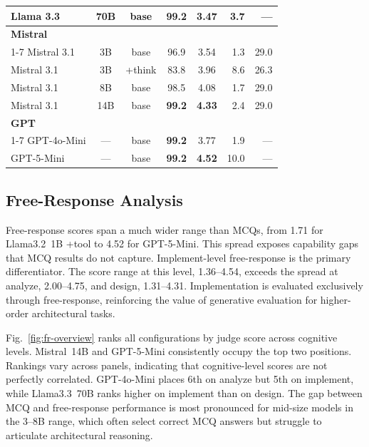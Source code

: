 \documentclass[conference]{IEEEtran}
\begin{document}
\begin{table}[t]
{\begin{tabular}{@{}lccccrr@{}}
    Llama 3.3     & 70B & base    & \textbf{99.2} & 3.47 & 3.7  & --- \\
    \midrule
    \multicolumn{7}{l}{\textbf{Mistral}} \\
    \cmidrule(lr){1-7}
    Mistral 3.1   & 3B  & base    & 96.9          & 3.54 & 1.3  & 29.0 \\
    Mistral 3.1   & 3B  & +think  & 83.8          & 3.96 & 8.6  & 26.3 \\
    Mistral 3.1   & 8B  & base    & 98.5          & 4.08 & 1.7  & 29.0 \\
    Mistral 3.1   & 14B & base    & \textbf{99.2} & \textbf{4.33} & 2.4 & 29.0 \\
    \midrule
    \multicolumn{7}{l}{\textbf{GPT}} \\
    \cmidrule(lr){1-7}
    GPT-4o-Mini   & --- & base    & \textbf{99.2} & 3.77 & 1.9  & --- \\
    GPT-5-Mini    & --- & base    & \textbf{99.2} & \textbf{4.52} & 10.0 & --- \\
    \bottomrule
  \end{tabular}}
\end{table}

\subsection{Free-Response Analysis}

Free-response scores span a much wider range than MCQs, from 1.71 for Llama3.2~1B +tool to 4.52 for GPT-5-Mini. This spread exposes capability gaps that MCQ results do not capture. Implement-level free-response is the primary differentiator. The score range at this level, 1.36--4.54, exceeds the spread at analyze, 2.00--4.75, and design, 1.31--4.31. Implementation is evaluated exclusively through free-response, reinforcing the value of generative evaluation for higher-order architectural tasks.

Fig.~\ref{fig:fr-overview} ranks all configurations by judge score across cognitive levels. Mistral~14B and GPT-5-Mini consistently occupy the top two positions. Rankings vary across panels, indicating that cognitive-level scores are not perfectly correlated. GPT-4o-Mini places 6th on analyze but 5th on implement, while Llama3.3~70B ranks higher on implement than on design. The gap between MCQ and free-response performance is most pronounced for mid-size models in the 3--8B range, which often select correct MCQ answers but struggle to articulate architectural reasoning.
\end{document}
